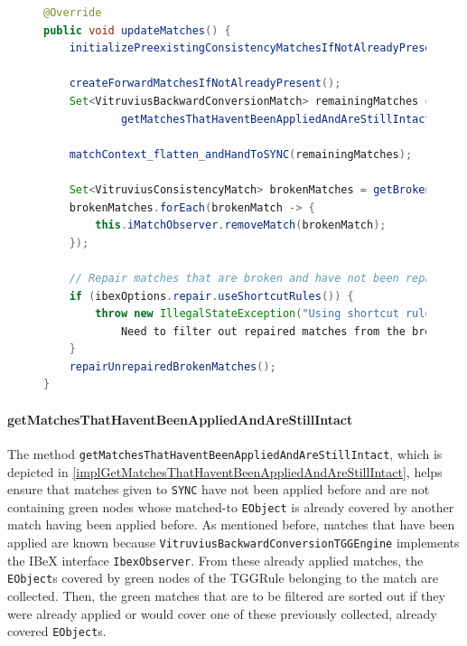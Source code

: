 \begin{figure}[H]
\centering
\begin{lstlisting}[language=java, caption={Copy mechanism in \texttt{ChangeSequenceTemplate}}, captionpos=b, label=implUpdateMatches]
@Override
public void updateMatches() {
    initializePreexistingConsistencyMatchesIfNotAlreadyPresent();

    createForwardMatchesIfNotAlreadyPresent();
    Set<VitruviusBackwardConversionMatch> remainingMatches = 
            getMatchesThatHaventBeenAppliedAndAreStillIntact();

    matchContext_flatten_andHandToSYNC(remainingMatches);

    Set<VitruviusConsistencyMatch> brokenMatches = getBrokenMatches();
    brokenMatches.forEach(brokenMatch -> {
        this.iMatchObserver.removeMatch(brokenMatch);
    });

    // Repair matches that are broken and have not been repaired by shortcut rules
    if (ibexOptions.repair.useShortcutRules()) {
        throw new IllegalStateException("Using shortcut rules not supported yet: 
            Need to filter out repaired matches from the broken matches...");
    }
    repairUnrepairedBrokenMatches();
}
\end{lstlisting}
\end{figure}

\paragraph{getMatchesThatHaventBeenAppliedAndAreStillIntact} The method \newline\texttt{getMatchesThatHaventBeenAppliedAndAreStillIntact}, which is depicted in \autoref{implGetMatchesThatHaventBeenAppliedAndAreStillIntact}, helps ensure that matches given to \texttt{SYNC} have not been applied before and are not containing green nodes whose matched-to \texttt{EObject} is already covered by another match having been applied before.
As mentioned before, matches that have been applied are known because \texttt{VitruviusBackwardConversionTGGEngine} implements the IBeX interface \texttt{IbexObserver}. 
From these already applied matches, the \texttt{EObject}s covered by green nodes of the TGGRule belonging to the match are collected.
Then, the green matches that are to be filtered are sorted out if they were already applied or would cover one of these previously collected, already covered \texttt{EObject}s.


